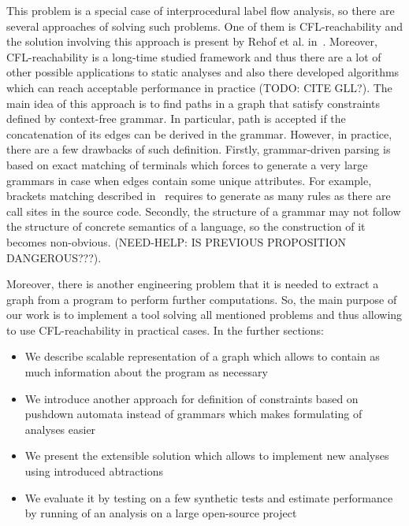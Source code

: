 This problem is a special case of interprocedural label flow analysis, so there are several approaches of solving such problems.
One of them is CFL-reachability and the solution involving this approach is present by Rehof et al. in~\cite{CFLr}.
Moreover, CFL-reachability is a long-time studied framework and thus there are a lot of other possible applications to static analyses and also there developed algorithms which can reach acceptable performance in practice (TODO: CITE GLL?).
The main idea of this approach is to find paths in a graph that satisfy constraints defined by context-free grammar.
In particular, path is accepted if the concatenation of its edges can be derived in the grammar.
However, in practice, there are a few drawbacks of such definition.
Firstly, grammar-driven parsing is based on exact matching of terminals which forces to generate a very large grammars in case when edges contain some unique attributes.
For example, brackets matching described in~\cite{CFLr} requires to generate as many rules as there are call sites in the source code.
Secondly, the structure of a grammar may not follow the structure of concrete semantics of a language, so the construction of it becomes non-obvious. (NEED-HELP: IS PREVIOUS PROPOSITION DANGEROUS???).

Moreover, there is another engineering problem that it is needed to extract a graph from a program to perform further computations.
So, the main purpose of our work is to implement a tool solving all mentioned problems and thus allowing to use CFL-reachability in practical cases.
In the further sections: 
\begin{itemize}
	\item We describe scalable representation of a graph which allows to contain as much information about the program as necessary
	\item We introduce another approach for definition of constraints based on pushdown automata instead of grammars which makes formulating of analyses easier
	\item We present the extensible solution which allows to implement new analyses using introduced abtractions
	\item We evaluate it by testing on a few synthetic tests and estimate performance by running of an analysis on a large open-source project
\end{itemize}

